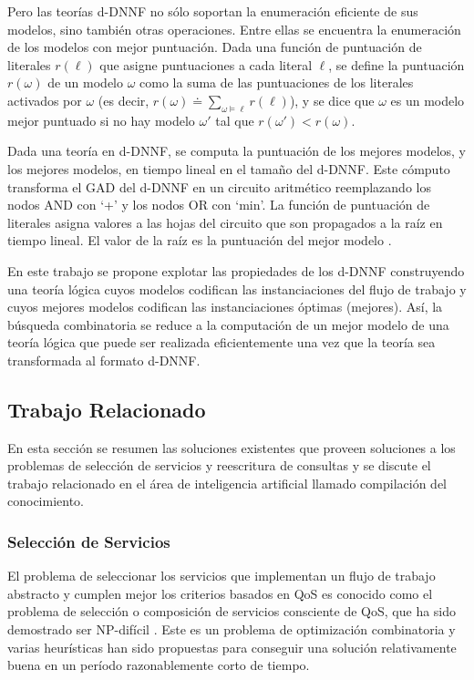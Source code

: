 Pero las teorías d-DNNF no sólo soportan la enumeración eficiente de sus
modelos, sino también otras operaciones. Entre ellas se encuentra la enumeración
de los modelos con mejor puntuación. Dada una función de puntuación de literales
$r(\ell)$ que asigne puntuaciones a cada literal $\ell$, se define la puntuación
$r(\omega)$ de un modelo $\omega$ como la suma de las puntuaciones de los literales
activados por $\omega$ (es decir,
$r(\omega)\doteq\sum_{\omega\vDash\ell}r(\ell)$), y se dice que $\omega$ es un modelo
mejor puntuado si no hay modelo $\omega'$ tal que $r(\omega')<r(\omega)$.

Dada una teoría en d-DNNF, se computa la puntuación de los mejores modelos, y
los mejores modelos, en tiempo lineal en el tamaño del d-DNNF. Este cómputo
transforma el GAD del d-DNNF en un circuito aritmético reemplazando los nodos
AND con `+' y los nodos OR con `min'. La función de puntuación de literales
asigna valores a las hojas del circuito que son propagados a la raíz en tiempo
lineal. El valor de la raíz es la puntuación del mejor modelo \cite{darwiche:weighted}.

En este trabajo se propone explotar las propiedades de los d-DNNF construyendo una
teoría lógica cuyos modelos codifican las instanciaciones del flujo de trabajo
y cuyos mejores modelos codifican las instanciaciones óptimas (mejores). Así, la
búsqueda combinatoria se reduce a la computación de un mejor modelo de una
teoría lógica que puede ser realizada eficientemente una vez que la teoría sea
transformada al formato d-DNNF.

\subsection{Trabajo Relacionado}

En esta sección se resumen las soluciones existentes que proveen soluciones
a los problemas de selección de servicios y reescritura de consultas y se
discute el trabajo relacionado en el área de inteligencia artificial llamado
compilación del conocimiento.

\subsubsection{Selección de Servicios}

El problema de seleccionar los servicios que implementan un flujo de trabajo
abstracto y cumplen mejor los criterios basados en QoS es conocido como el
problema de selección o composición de servicios consciente de QoS, que ha sido
demostrado ser NP-difícil \cite{Hiroshi2008}. Este es un problema de optimización
combinatoria y varias heurísticas han sido propuestas para conseguir una
solución relativamente buena en un período razonablemente corto de tiempo.

